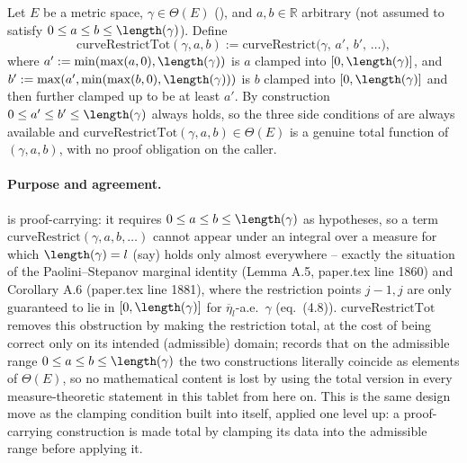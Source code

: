 \begin{definition}
  Let $E$ be a metric space, $\gamma \in \Theta(E)$ (), and $a, b \in \mathbb{R}$
  arbitrary (not assumed to satisfy $0 \le a \le b \le \length(\gamma)$). Define
  \[
    \mathrm{curveRestrictTot}(\gamma,a,b) := \mathrm{curveRestrict}\bigl(\gamma,\, a',\, b',\, \dots\bigr)
    ,
  \]
  where $a' := \min(\max(a,0),\length(\gamma))$ is $a$ clamped into $[0,\length(\gamma)]$, and
  $b' := \max(a', \min(\max(b,0),\length(\gamma)))$ is $b$ clamped into $[0,\length(\gamma)]$ and
  then further clamped up to be at least $a'$. By construction $0 \le a' \le b' \le \length(\gamma)$
  always holds, so the three side conditions of  are always available and
  $\mathrm{curveRestrictTot}(\gamma,a,b) \in \Theta(E)$ is a genuine total function of
  $(\gamma,a,b)$, with no proof obligation on the caller.

  \paragraph{Purpose and agreement.}  is proof-carrying: it requires
  $0 \le a \le b \le \length(\gamma)$ as hypotheses, so a term $\mathrm{curveRestrict}(\gamma,a,b,\dots)$
  cannot appear under an integral over a measure for which $\length(\gamma) = l$ (say) holds only
  almost everywhere -- exactly the situation of the Paolini--Stepanov marginal identity (Lemma A.5,
  paper.tex line 1860) and Corollary A.6 (paper.tex line 1881), where the restriction points
  $j-1, j$ are only guaranteed to lie in $[0,\length(\gamma)]$ for $\overline{\eta}_l$-a.e.\ $\gamma$
  (eq.~(4.8)). $\mathrm{curveRestrictTot}$ removes this obstruction by making the restriction total,
  at the cost of being correct only on its intended (admissible) domain; 
  records that on the admissible range $0 \le a \le b \le \length(\gamma)$ the two constructions
  literally coincide as elements of $\Theta(E)$, so no mathematical content is lost by using the
  total version in every measure-theoretic statement in this tablet from here on. This is the same
  design move as the clamping condition built into  itself, applied one level up: a
  proof-carrying construction is made total by clamping its data into the admissible range before
  applying it.
\end{definition}
